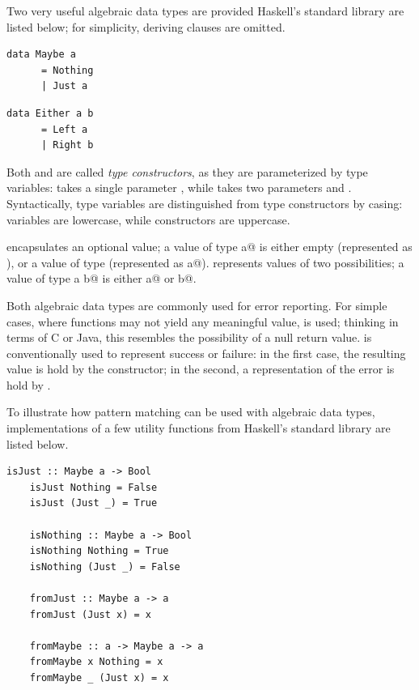 \documentclass[UdineBachThesis,american,11pt]{PhdThesis}
\begin{document}
  Two very useful algebraic data types are provided Haskell's standard library
  are listed below; for simplicity, deriving clauses are omitted.

  \begin{lstlisting}[gobble=4,basicstyle=\ttfamily\small]
    data Maybe a
      = Nothing
      | Just a
    \end{lstlisting}

    \begin{lstlisting}[gobble=4,basicstyle=\ttfamily\small]
    data Either a b
      = Left a
      | Right b
  \end{lstlisting}

  Both \lstinline@Maybe@ and \lstinline@Either@ are called \emph{type
  constructors}, as they are parameterized by type variables: \lstinline@Maybe@
  takes a single parameter \lstinline@a@, while \lstinline@Either@ takes two
  parameters \lstinline@a@ and \lstinline@b@. Syntactically, type variables are
  distinguished from type constructors by casing: variables are lowercase, while
  constructors are uppercase.

  \lstinline@Maybe@ encapsulates an optional value; a value of type
  \lstinline@Maybe a@ is either empty (represented as \lstinline@Nothing@), or a
  value of type \lstinline@a@ (represented as \lstinline@Just a@).
  \lstinline@Either@ represents values of two possibilities; a value of type
  \lstinline@Either a b@ is either \lstinline@Left a@ or \lstinline@Right b@.

  Both algebraic data types are commonly used for error reporting. For simple
  cases, where functions may not yield any meaningful value, \lstinline@Maybe@
  is used; thinking in terms of C or Java, this resembles the possibility of a
  null return value. \lstinline@Either@ is conventionally used to represent
  success or failure: in the first case, the resulting value is hold by the
  \lstinline@Right@ constructor; in the second, a representation of the error is
  hold by \lstinline@Left@.

  To illustrate how pattern matching can be used with algebraic data types,
  implementations of a few utility functions from Haskell's standard library
  are listed below.

  \begin{lstlisting}[gobble=4,basicstyle=\ttfamily\small]
    isJust :: Maybe a -> Bool
    isJust Nothing = False
    isJust (Just _) = True

    isNothing :: Maybe a -> Bool
    isNothing Nothing = True
    isNothing (Just _) = False

    fromJust :: Maybe a -> a
    fromJust (Just x) = x

    fromMaybe :: a -> Maybe a -> a
    fromMaybe x Nothing = x
    fromMaybe _ (Just x) = x
  \end{lstlisting}
\end{document}
